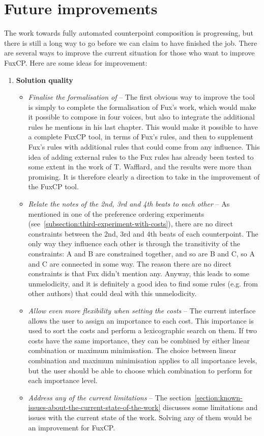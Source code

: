 \section{Future improvements}
The work towards fully automated counterpoint composition is progressing, but there is still a long way to go before we can claim to have finished the job. There are several ways to improve the current situation for those who want to improve FuxCP. Here are some ideas for improvement:
\begin{enumerate}
  \item \textbf{Solution quality}
  \begin{itemize}
    \item \textit{Finalise the formalisation of \gap} -- The first obvious way to improve the tool is simply to complete the formalisation of Fux's work, which would make it possible to compose in four voices, but also to integrate the additional rules he mentions in his last chapter. This would make it possible to have a complete FuxCP tool, in terms of Fux's rules, and then to supplement Fux's rules with additional rules that could come from any influence. This idea of adding external rules to the Fux rules has already been tested to some extent in the work of T. Wafflard, and the results were more than promising. It is therefore clearly a direction to take in the improvement of the FuxCP tool.
    \item \textit{Relate the notes of the 2nd, 3rd and 4th beats to each other} -- As mentioned in one of the preference ordering experiments (see~\ref{subsection:third-experiment-with-costs}), there are no direct constraints between the 2nd, 3rd and 4th beats of each counterpoint. The only way they influence each other is through the transitivity of the constraints: A and B are constrained together, and so are B and C, so A and C are connected in some way. The reason there are no direct constraints is that Fux didn't mention any. Anyway, this leads to some unmelodicity, and it is definitely a good idea to find some rules (e.g. from other authors) that could deal with this unmelodicity. 
    \item \textit{Allow even more flexibility when setting the costs} -- The current interface allows the user to assign an importance to each cost. This importance is used to sort the costs and perform a lexicographic search on them. If two costs have the same importance, they can be combined by either linear combination or maximum minimisation. The choice between linear combination and maximum minimisation applies to all importance levels, but the user should be able to choose which combination to perform for each importance level.
    \item \textit{Address any of the current limitations} -- The section~\ref{section:known-issues-about-the-current-state-of-the-work} discusses some limitations and issues with the current state of the work. Solving any of them would be an improvement for FuxCP.
  \end{itemize}
  

\end{enumerate}
